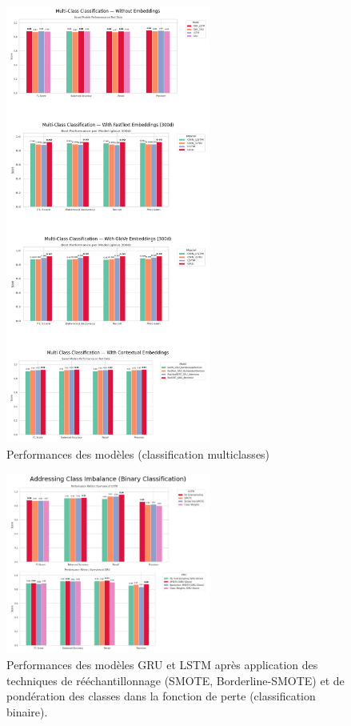 \documentclass[12pt]{report}
\begin{document}
\begin{figure}[H]
\centering
\includegraphics[width=0.6\textwidth]{multi_class_performances.png}
\caption{Performances des modèles (classification multiclasses)}
\label{fig:multi_class_performance}
\end{figure}

\begin{figure}[H]
\centering
\includegraphics[width=0.6\textwidth]{resampling.png}
\caption{Performances des modèles GRU et LSTM après application des techniques de rééchantillonnage (SMOTE, Borderline-SMOTE) et de pondération des classes dans la fonction de perte (classification binaire).}
\label{fig:resampling}
\end{figure}
\end{document}
